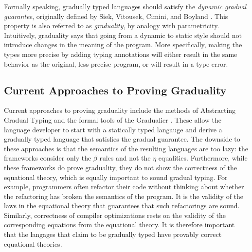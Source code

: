 Formally speaking, gradually typed languages should satisfy the 
\emph{dynamic gradual guarantee}, originally defined by Siek, Vitousek, Cimini,
and Boyland \cite{siek_et_al:LIPIcs:2015:5031}.
This property is also referred to as \emph{graduality}, by analogy with parametricity.
Intuitively, graduality says that going from a dynamic to static style should not
introduce changes in the meaning of the program.
More specifically, making the types more precise by adding typing annotations
will either result in the same behavior as the original, less precise program,
or will result in a type error.


\subsection{Current Approaches to Proving Graduality}
Current approaches to proving graduality include the methods of Abstracting Gradual Typing
\cite{garcia-clark-tanter2016} and the formal tools of the Gradualier \cite{cimini-siek2016}.
These allow the language developer to start with a statically typed langauge and derive a
gradually typed language that satisfies the gradual guarantee. The downside to these approaches
is that the semantics of the resulting languages are too lazy: the frameworks consider only
the $\beta$ rules and not the $\eta$ equalities. Furthermore, while these frameworks do prove
graduality, they do not show the correctness of the equational theory, which is equally important
to sound gradual typing. For example, programmers often refactor their code without thinking about
whether the refactoring has broken the semantics of the program. 
It is the validity of the laws in the equational theory that guarantees that such refactorings are sound. 
Similarly, correctness of compiler optimizations rests on the validity of the corresponding equations
from the equational theory. It is therefore important that the langages that claim to be gradually typed
have provably correct equational theories.


